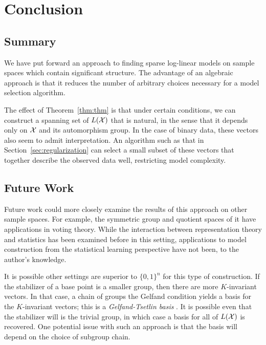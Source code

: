 \documentclass[cclicense]{hmcthesis}
\numberwithin{equation}{chapter}
\numberwithin{ucounter}{chapter}
\begin{document}
\chapter{Conclusion}

\section{Summary}

    We have put forward an approach to finding sparse log-linear models on
    sample spaces which contain significant structure.  The advantage of an
    algebraic approach is that it reduces the number of arbitrary choices
    necessary for a model selection algorithm.

    The effect of Theorem~\ref{thm:thm} is that under certain conditions, we can
    construct a spanning set of $L(\mathcal{X})$ that is natural, in the sense that it
    depends only on $\mathcal{X}$ and its automorphism group.  In the case of binary
    data, these vectors also seem to admit interpretation.  An algorithm such as
    that in Section~\ref{sec:regularization} can select a small subset of these
    vectors that together describe the observed data well, restricting model
    complexity.

\section{Future Work}

    Future work could more closely examine the results of this approach on other
    sample spaces.  For example, the symmetric group and quotient spaces of it
    have applications in voting theory.  While the interaction between
    representation theory and statistics has been examined before in this
    setting, applications to model construction from the statistical learning
    perspective have not been, to the author's knowledge.

    It is possible other settings are superior to $\{0, 1\}^n$ for this type of
    construction.  If the stabilizer of a base point is a smaller group, then
    there are more $K$-invariant vectors.  In that case, a chain of groups the
    Gelfand condition yields a basis for the $K$-invariant vectors; this is a
    \emph{Gelfand-Tsetlin basis} \citep{Harm}.  It is possible even that the
    stabilizer will is the trivial group, in which case a basis for all of
    $L(\mathcal{X})$ is recovered.  One potential issue with such an approach is that
    the basis will depend on the choice of subgroup chain.  
\end{document}
